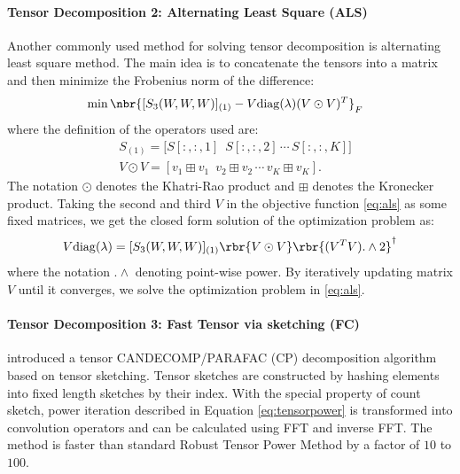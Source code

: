 \documentclass[twoside,11pt]{article}
\begin{document}
{\paragraph{Tensor Decomposition 2: Alternating Least Square (ALS)}
\label{sec:td2}
Another commonly used method for
solving tensor decomposition is alternating least square method. The
main idea is to concatenate the tensors into a matrix and then
minimize the Frobenius norm of the difference:
\begin{align}
\label{eq:als}
  &\min \nbr{ [S_{3}(W,W,W)]_{(1)} - V \mathrm{diag}({\bf \lambda}) (V\odot V)^T}_F 
  \end{align}
where the definition of the operators used are:
\begin{align}
 &S_{(1)} = \Big[ S[:,:,1] \,\,\, S[:,:,2] \, \cdots \, S[:,:,K]\Big]  \\
 & V \odot V = [v_1 \boxplus v_1 \,\,\,  v_2 \boxplus v_2 \, \cdots \, v_K \boxplus v_K ].
\end{align}
The notation $\odot$ denotes the Khatri-Rao product and $\boxplus$ denotes 
the Kronecker product. Taking the second and third $V$ in the objective function
\eqref{eq:als} as some fixed matrices, we get the closed form solution of the
 optimization problem as:
\begin{align}
  \nonumber
  V \mathrm{diag}({\bf \lambda}) = [S_{3}(W,W,W)]_{(1)}\rbr{V \odot V}\rbr{(V^TV).\wedge2 }^{\dag}
\end{align}
where the notation $.\wedge$ denoting point-wise power. By iteratively updating matrix$V$ until it converges, we solve the optimization problem in \eqref{eq:als}.


\paragraph{Tensor Decomposition 3: Fast Tensor via sketching (FC) }
\label{sectd3}
\cite{WanTunSmoAna15} introduced a tensor CANDECOMP/PARAFAC (CP)
 decomposition algorithm based on tensor sketching. Tensor sketches are constructed 
 by hashing elements into fixed length sketches by their index. With the special property
  of count sketch, power iteration described in Equation \eqref{eq:tensorpower} is
   transformed into convolution operators and can be calculated using FFT and 
   inverse FFT. The method is faster than standard Robust Tensor Power Method by a factor of $10$ to $100$.

}
\end{document}
